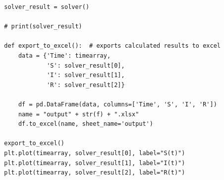 \documentclass[11pt, a4paper]{article}
\begin{document}
\begin{lstlisting}
        solver_result = solver()

        # print(solver_result)

        def export_to_excel():  # exports calculated results to excel
            data = {'Time': timearray,
                    'S': solver_result[0],
                    'I': solver_result[1],
                    'R': solver_result[2]}

            df = pd.DataFrame(data, columns=['Time', 'S', 'I', 'R'])
            name = "output" + str(f) + ".xlsx"
            df.to_excel(name, sheet_name='output')

        export_to_excel()
        plt.plot(timearray, solver_result[0], label="S(t)")
        plt.plot(timearray, solver_result[1], label="I(t)")
        plt.plot(timearray, solver_result[2], label="R(t)")
    
    
\end{lstlisting}
\end{document}

